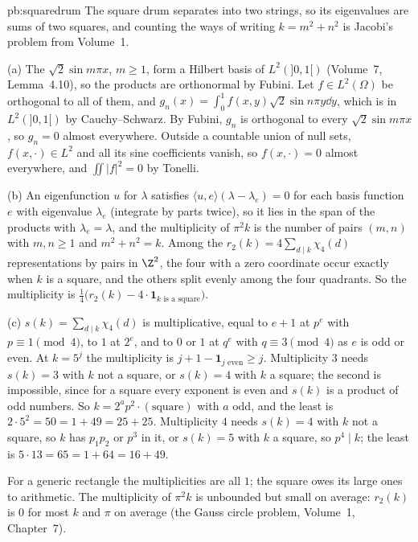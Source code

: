 \begin{solution}{pb:squaredrum}
\idea The square drum separates into two strings, so its eigenvalues are sums of two squares, and counting the ways of writing $k=m^2+n^2$ is Jacobi's problem from Volume~1.

\writeup (a) The $\sqrt2\sin m\pi x$, $m\ge1$, form a Hilbert basis of $L^2(]0,1[)$ (Volume~7, Lemma~4.10), so the products are orthonormal by Fubini. Let $f\in L^2(\Omega)$ be orthogonal to all of
them, and $g_n(x)=\int_0^1f(x,y)\sqrt2\sin n\pi y\dd y$, which is in $L^2(]0,1[)$ by Cauchy--Schwarz. By Fubini, $g_n$ is orthogonal to every $\sqrt2\sin m\pi x$, so $g_n=0$ almost everywhere.
Outside a countable union of null sets, $f(x,\cdot)\in L^2$ and all its sine coefficients vanish, so $f(x,\cdot)=0$ almost everywhere, and $\iint|f|^2=0$ by Tonelli.

(b) An eigenfunction $u$ for $\lambda$ satisfies $\langle u,e\rangle(\lambda-\lambda_e)=0$ for each basis function $e$ with eigenvalue $\lambda_e$ (integrate by parts twice), so it lies in the span of the
products with $\lambda_e=\lambda$, and the multiplicity of $\pi^2k$ is the number of pairs $(m,n)$ with $m,n\ge1$ and $m^2+n^2=k$. Among the $r_2(k)=4\sum_{d\mid k}\chi_4(d)$ representations by
pairs in $\Z^2$, the four with a zero coordinate occur exactly when $k$ is a square, and the others split evenly among the four quadrants. So the multiplicity is
$\frac14\bigl(r_2(k)-4\cdot\mathbf 1_{k\text{ is a square}}\bigr)$.

(c) $s(k)=\sum_{d\mid k}\chi_4(d)$ is multiplicative, equal to $e+1$ at $p^e$ with $p\equiv1\pmod4$, to $1$ at $2^e$, and to $0$ or $1$ at $q^e$ with $q\equiv3\pmod4$ as $e$ is odd or even. At
$k=5^j$ the multiplicity is $j+1-\mathbf 1_{j\text{ even}}\ge j$. Multiplicity $3$ needs $s(k)=3$ with $k$ not a square, or $s(k)=4$ with $k$ a square; the second is impossible, since for a
square every exponent is even and $s(k)$ is a product of odd numbers. So $k=2^a p^2\cdot(\text{square})$ with $a$ odd, and the least is $2\cdot5^2=50=1+49=25+25$. Multiplicity $4$ needs
$s(k)=4$ with $k$ not a square, so $k$ has $p_1p_2$ or $p^3$ in it, or $s(k)=5$ with $k$ a square, so $p^4\mid k$; the least is $5\cdot13=65=1+64=16+49$.

\leads For a generic rectangle the multiplicities are all $1$; the square owes its large ones to arithmetic. The multiplicity of $\pi^2k$ is unbounded but small on average: $r_2(k)$ is $0$ for most
$k$ and $\pi$ on average (the Gauss circle problem, Volume~1, Chapter~7).
\end{solution}

